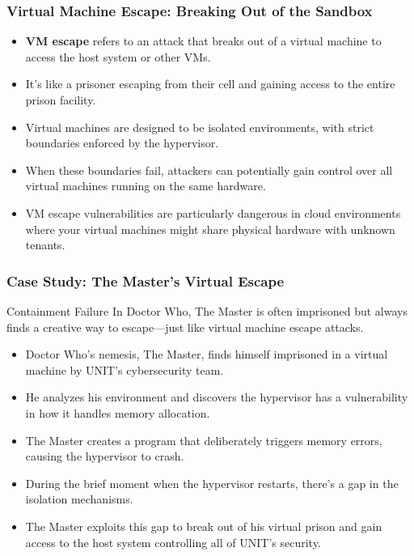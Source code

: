 \documentclass{beamer}
\begin{document}
\begin{frame}
    \frametitle{Virtual Machine Escape: Breaking Out of the Sandbox}
    
    \begin{itemize}
        \item \textbf{VM escape} refers to an attack that breaks out of a virtual machine to access the host system or other VMs.
        \item It's like a prisoner escaping from their cell and gaining access to the entire prison facility.
        \item Virtual machines are designed to be isolated environments, with strict boundaries enforced by the hypervisor.
        \item When these boundaries fail, attackers can potentially gain control over all virtual machines running on the same hardware.
        \item VM escape vulnerabilities are particularly dangerous in cloud environments where your virtual machines might share physical hardware with unknown tenants.
    \end{itemize}
\end{frame}

\begin{frame}
    \frametitle{Case Study: The Master's Virtual Escape}
    
    \begin{alertblock}{Containment Failure}
        In Doctor Who, The Master is often imprisoned but always finds a creative way to escape—just like virtual machine escape attacks.
    \end{alertblock}
    
    \begin{itemize}
        \item Doctor Who's nemesis, The Master, finds himself imprisoned in a virtual machine by UNIT's cybersecurity team.
        \item He analyzes his environment and discovers the hypervisor has a vulnerability in how it handles memory allocation.
        \item The Master creates a program that deliberately triggers memory errors, causing the hypervisor to crash.
        \item During the brief moment when the hypervisor restarts, there's a gap in the isolation mechanisms.
        \item The Master exploits this gap to break out of his virtual prison and gain access to the host system controlling all of UNIT's security.
    \end{itemize}
\end{frame}
\end{document}
